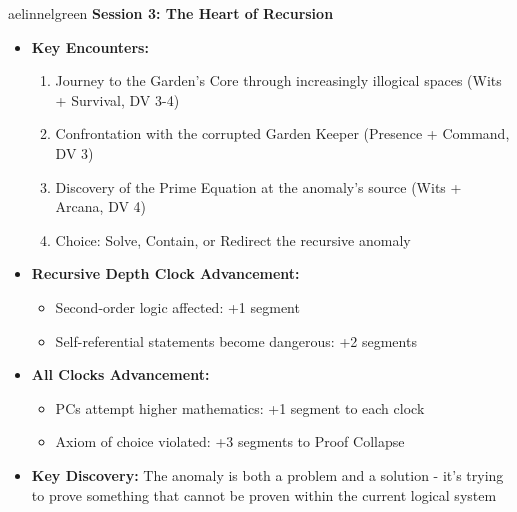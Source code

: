 \documentclass[11pt]{article}
\begin{document}
\begin{campaignsection}{aelinnelgreen}
\textbf{Session 3: The Heart of Recursion}
\begin{itemize}
    \item \textbf{Key Encounters:}
    \begin{enumerate}
        \item Journey to the Garden's Core through increasingly illogical spaces (Wits + Survival, DV 3-4)
        \item Confrontation with the corrupted Garden Keeper (Presence + Command, DV 3)
        \item Discovery of the Prime Equation at the anomaly's source (Wits + Arcana, DV 4)
        \item Choice: Solve, Contain, or Redirect the recursive anomaly
    \end{enumerate}
    \item \textbf{Recursive Depth Clock Advancement:}
    \begin{itemize}
        \item Second-order logic affected: +1 segment
        \item Self-referential statements become dangerous: +2 segments
    \end{itemize}
    \item \textbf{All Clocks Advancement:}
    \begin{itemize}
        \item PCs attempt higher mathematics: +1 segment to each clock
        \item Axiom of choice violated: +3 segments to Proof Collapse
    \end{itemize}
    \item \textbf{Key Discovery:} The anomaly is both a problem and a solution - it's trying to prove something that cannot be proven within the current logical system
\end{itemize}
\end{campaignsection}

\newpage
\end{document}
